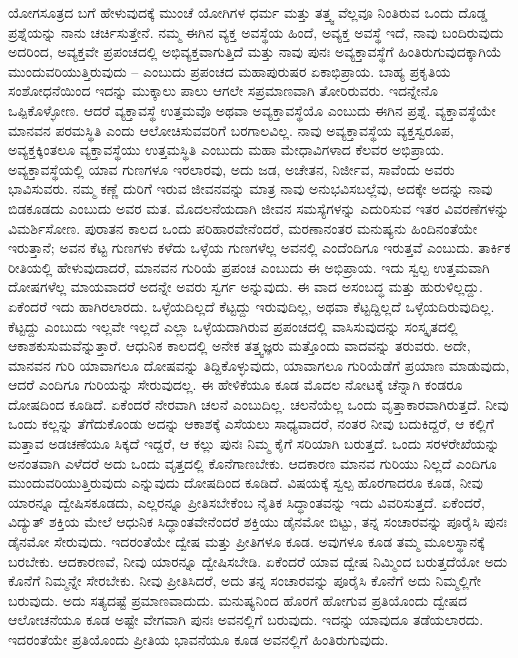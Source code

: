 ಯೋಗಸೂತ್ರದ ಬಗೆ ಹೇಳುವುದಕ್ಕೆ ಮುಂಚೆ ಯೋಗಿಗಳ ಧರ್ಮ ಮತ್ತು ತತ್ತ್ವ ವೆಲ್ಲವೂ ನಿಂತಿರುವ ಒಂದು ದೊಡ್ಡ ಪ್ರಶ್ನೆಯನ್ನು ನಾನು ಚರ್ಚಿಸುತ್ತೇನೆ. ನಮ್ಮ ಈಗಿನ ವ್ಯಕ್ತ ಅವಸ್ಥೆಯ ಹಿಂದೆ, ಅವ್ಯಕ್ತ ಅವಸ್ಥೆ ಇದೆ, ನಾವು ಬಂದಿರುವುದು ಅದರಿಂದ, ಅವ್ಯಕ್ತವೇ ಪ್ರಪಂಚದಲ್ಲಿ ಅಭಿವ್ಯಕ್ತವಾಗುತ್ತಿದೆ ಮತ್ತು ನಾವು ಪುನಃ ಅವ್ಯಕ್ತಾವಸ್ಥೆಗೆ ಹಿಂತಿರುಗುವುದಕ್ಕಾಗಿಯೆ ಮುಂದುವರಿಯುತ್ತಿರುವುದು – ಎಂಬುದು ಪ್ರಪಂಚದ ಮಹಾಪುರುಷರ ಏಕಾಭಿಪ್ರಾಯ. ಬಾಹ್ಯ ಪ್ರಕೃತಿಯ ಸಂಶೋಧನೆಯಿಂದ ಇದನ್ನು ಮುಕ್ಕಾಲು ಪಾಲು ಆಗಲೇ ಸಪ್ರಮಾಣವಾಗಿ ತೋರಿರುವರು. ಇದನ್ನೇನೊ ಒಪ್ಪಿಕೊಳ್ಳೋಣ. ಆದರೆ ವ್ಯಕ್ತಾವಸ್ಥೆ ಉತ್ತಮವೊ ಅಥವಾ ಅವ್ಯಕ್ತಾವಸ್ಥೆಯೊ ಎಂಬುದು ಈಗಿನ ಪ್ರಶ್ನೆ. ವ್ಯಕ್ತಾವಸ್ಥೆಯೇ ಮಾನವನ ಪರಮಸ್ಥಿತಿ ಎಂದು ಆಲೋಚಿಸುವವರಿಗೆ ಬರಗಾಲವಿಲ್ಲ. ನಾವು ಅವ್ಯಕ್ತಾವಸ್ಥೆಯ ವ್ಯಕ್ತಸ್ವರೂಪ, ಅವ್ಯಕ್ತಕ್ಕಿಂತಲೂ ವ್ಯಕ್ತಾವಸ್ಥೆಯು ಉತ್ತಮಸ್ಥಿತಿ ಎಂಬುದು ಮಹಾ ಮೇಧಾವಿಗಳಾದ ಕೆಲವರ ಅಭಿಪ್ರಾಯ. ಅವ್ಯಕ್ತಾವಸ್ಥೆಯಲ್ಲಿ ಯಾವ ಗುಣಗಳೂ ಇರಲಾರವು, ಅದು ಜಡ, ಅಚೇತನ, ನಿರ್ಜೀವ, ಸಾವೆಂದು ಅವರು ಭಾವಿಸುವರು. ನಮ್ಮ ಕಣ್ಣೆ ದುರಿಗೆ ಇರುವ ಜೀವನವನ್ನು ಮಾತ್ರ ನಾವು ಅನುಭವಿಸಬಲ್ಲೆವು, ಅದಕ್ಕೇ ಅದನ್ನು ನಾವು ಬಿಡಕೂಡದು ಎಂಬುದು ಅವರ ಮತ. ಮೊದಲನೆಯದಾಗಿ ಜೀವನ ಸಮಸ್ಯೆಗಳನ್ನು ಎದುರಿಸುವ ಇತರ ವಿವರಣೆಗಳನ್ನು ವಿಮರ್ಶಿಸೋಣ. ಪುರಾತನ ಕಾಲದ ಒಂದು ಪರಿಹಾರವೇನೆಂದರೆ, ಮರಣಾನಂತರ ಮನುಷ್ಯನು ಹಿಂದಿನಂತೆಯೇ ಇರುತ್ತಾನೆ; ಅವನ ಕೆಟ್ಟ ಗುಣಗಳು ಕಳೆದು ಒಳ್ಳೆಯ ಗುಣಗಳೆಲ್ಲ ಅವನಲ್ಲಿ ಎಂದೆಂದಿಗೂ ಇರುತ್ತವೆ ಎಂಬುದು. ತಾರ್ಕಿಕ ರೀತಿಯಲ್ಲಿ ಹೇಳುವುದಾದರೆ, ಮಾನವನ ಗುರಿಯೆ ಪ್ರಪಂಚ ಎಂಬುದು ಈ ಅಭಿಪ್ರಾಯ. ಇದು ಸ್ವಲ್ಪ ಉತ್ತಮವಾಗಿ ದೋಷಗಳೆಲ್ಲ ಮಾಯವಾದರೆ ಅದನ್ನೇ ಅವರು ಸ್ವರ್ಗ ಅನ್ನುವುದು. ಈ ವಾದ ಅಸಂಬದ್ಧ ಮತ್ತು ಹುರುಳಿಲ್ಲದ್ದು. ಏಕೆಂದರೆ ಇದು ಹಾಗಿರಲಾರದು. ಒಳ್ಳೆಯದಿಲ್ಲದೆ ಕೆಟ್ಟದ್ದು ಇರುವುದಿಲ್ಲ, ಅಥವಾ ಕೆಟ್ಟದ್ದಿಲ್ಲದೆ ಒಳ್ಳೆಯದಿರುವುದಿಲ್ಲ. ಕೆಟ್ಟದ್ದು ಎಂಬುದು ಇಲ್ಲವೇ ಇಲ್ಲದೆ ಎಲ್ಲಾ ಒಳ್ಳೆಯದಾಗಿರುವ ಪ್ರಪಂಚದಲ್ಲಿ ವಾಸಿಸುವುದನ್ನು ಸಂಸ್ಕೃತದಲ್ಲಿ ಆಕಾಶಕುಸುಮವೆನ್ನುತ್ತಾರೆ. ಆಧುನಿಕ ಕಾಲದಲ್ಲಿ ಅನೇಕ ತತ್ತ್ವಜ್ಞರು ಮತ್ತೊಂದು ವಾದವನ್ನು ತರುವರು. ಅದೇ, ಮಾನವನ ಗುರಿ ಯಾವಾಗಲೂ ದೋಷವನ್ನು ತಿದ್ದಿಕೊಳ್ಳುವುದು, ಯಾವಾಗಲೂ ಗುರಿಯೆಡೆಗೆ ಪ್ರಯಾಣ ಮಾಡುವುದು, ಆದರೆ ಎಂದಿಗೂ ಗುರಿಯನ್ನು ಸೇರುವುದಲ್ಲ. ಈ ಹೇಳಿಕೆಯೂ ಕೂಡ ಮೊದಲ ನೋಟಕ್ಕೆ ಚೆನ್ನಾಗಿ ಕಂಡರೂ ದೋಷದಿಂದ ಕೂಡಿದೆ. ಏಕೆಂದರೆ ನೇರವಾಗಿ ಚಲನೆ ಎಂಬುದಿಲ್ಲ. ಚಲನೆಯೆಲ್ಲ ಒಂದು ವೃತ್ತಾಕಾರವಾಗಿರುತ್ತದೆ. ನೀವು ಒಂದು ಕಲ್ಲನ್ನು ತೆಗೆದುಕೊಂಡು ಅದನ್ನು ಆಕಾಶಕ್ಕೆ ಎಸೆಯಲು ಸಾಧ್ಯವಾದರೆ, ನಂತರ ನೀವು ಬದುಕಿದ್ದರೆ, ಆ ಕಲ್ಲಿಗೆ ಮತ್ತಾವ ಅಡಚಣೆಯೂ ಸಿಕ್ಕದೆ ಇದ್ದರೆ, ಆ ಕಲ್ಲು ಪುನಃ ನಿಮ್ಮ ಕೈಗೆ ಸರಿಯಾಗಿ ಬರುತ್ತದೆ. ಒಂದು ಸರಳರೇಖೆಯನ್ನು ಅನಂತವಾಗಿ ಎಳೆದರೆ ಅದು ಒಂದು ವೃತ್ತದಲ್ಲಿ ಕೊನೆಗಾಣಬೇಕು. ಆದಕಾರಣ ಮಾನವ ಗುರಿಯು ನಿಲ್ಲದೆ ಎಂದಿಗೂ ಮುಂದುವರಿಯುತ್ತಿರುವುದು ಎನ್ನುವುದು ದೋಷದಿಂದ ಕೂಡಿದೆ. ವಿಷಯಕ್ಕೆ ಸ್ವಲ್ಪ ಹೊರಗಾದರೂ ಕೂಡ, ನೀವು ಯಾರನ್ನೂ ದ್ವೇಷಿಸಕೂಡದು, ಎಲ್ಲರನ್ನೂ ಪ್ರೀತಿಸಬೇಕೆಂಬ ನೈತಿಕ ಸಿದ್ಧಾಂತವನ್ನು ಇದು ವಿವರಿಸುತ್ತದೆ. ಏಕೆಂದರೆ, ವಿದ್ಯುತ್​ ಶಕ್ತಿಯ ಮೇಲೆ ಆಧುನಿಕ ಸಿದ್ಧಾಂತವೇನೆಂದರೆ ಶಕ್ತಿಯು ಡೈನಮೋ ಬಿಟ್ಟು, ತನ್ನ ಸಂಚಾರವನ್ನು ಪೂರೈಸಿ ಪುನಃ ಡೈನಮೋ ಸೇರುವುದು. ಇದರಂತೆಯೇ ದ್ವೇಷ ಮತ್ತು ಪ್ರೀತಿಗಳೂ ಕೂಡ. ಅವುಗಳೂ ಕೂಡ ತಮ್ಮ ಮೂಲಸ್ಥಾನಕ್ಕೆ ಬರಬೇಕು. ಆದಕಾರಣವೆ, ನೀವು ಯಾರನ್ನೂ ದ್ವೇಷಿಸಬೇಡಿ. ಏಕೆಂದರೆ ಯಾವ ದ್ವೇಷ ನಿಮ್ಮಿಂದ ಬರುತ್ತದೆಯೋ ಅದು ಕೊನೆಗೆ ನಿಮ್ಮನ್ನೇ ಸೇರಬೇಕು. ನೀವು ಪ್ರೀತಿಸಿದರೆ, ಅದು ತನ್ನ ಸಂಚಾರವನ್ನು ಪೂರೈಸಿ ಕೊನೆಗೆ ಅದು ನಿಮ್ಮಲ್ಲಿಗೇ ಬರುವುದು. ಅದು ಸತ್ಯದಷ್ಟೆ ಪ್ರಮಾಣವಾದುದು. ಮನುಷ್ಯನಿಂದ ಹೊರಗೆ ಹೋಗುವ ಪ್ರತಿಯೊಂದು ದ್ವೇಷದ ಆಲೋಚನೆಯೂ ಕೂಡ ಅಷ್ಟೇ ವೇಗವಾಗಿ ಪುನಃ ಅವನಲ್ಲಿಗೆ ಬರುವುದು. ಇದನ್ನು ಯಾವುದೂ ತಡೆಯಲಾರದು. ಇದರಂತೆಯೇ ಪ್ರತಿಯೊಂದು ಪ್ರೀತಿಯ ಭಾವನೆಯೂ ಕೂಡ ಅವನಲ್ಲಿಗೆ ಹಿಂತಿರುಗುವುದು. 

